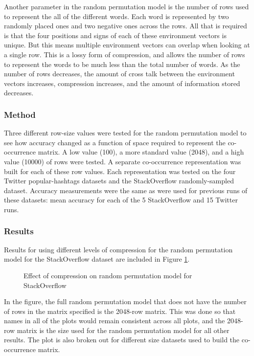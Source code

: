 \documentclass[man,floatsintext,donotrepeattitle]{apa6}
\begin{document}
Another parameter in the random permutation model is the number of rows used to represent the all of the different words.
Each word is represented by two randomly placed ones and two negative ones across the rows.
All that is required is that the four positions and signs of each of these environment vectors is unique.
But this means multiple environment vectors can overlap when looking at a single row.
This is a lossy form of compression, and allows the number of rows to represent the words to be much less than the total number of words.
As the number of rows decreases, the amount of cross talk between the environment vectors increases, compression increases, and the amount of information stored decreases.

\subsubsection{Method}

Three different row-size values were tested for the random permutation model to see how accuracy changed as a function of space required to represent the co-occurrence matrix.
A low value (\num{100}), a more standard value (\num{2048}), and a high value (\num{10000}) of rows were tested.
A separate co-occurrence representation was built for each of these row values.
Each representation was tested on the four Twitter popular-hashtags datasets and the StackOverflow randomly-sampled dataset.
Accuracy measurements were the same as were used for previous runs of these datasets: mean accuracy for each of the 5 StackOverflow and 15 Twitter runs.

\subsubsection{Results}

Results for using different levels of compression for the random permutation model for the StackOverflow dataset are included in Figure \ref{figContextDimSO}.

\begin{figure}[!htbp]
  \caption{Effect of compression on random permutation model for StackOverflow}
  \label{figContextDimSO}
\end{figure}

In the figure, the full random permutation model that does not have the number of rows in the matrix specified is the \num{2048}-row matrix.
This was done so that names in all of the plots would remain consistent across all plots, and the \num{2048}-row matrix is the size used for the random permutation model for all other results.
The plot is also broken out for different size datasets used to build the co-occurrence matrix.
\end{document}

